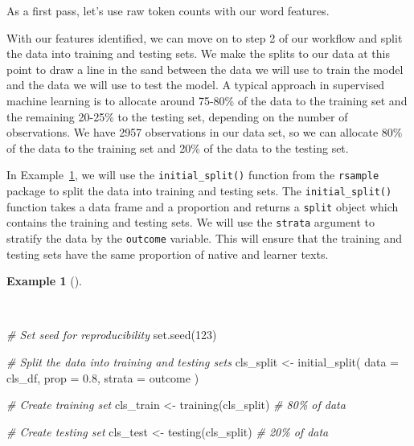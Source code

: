 \documentclass[
  letterpaper,
  DIV=11,
  numbers=noendperiod]{scrreprt}
\newenvironment{Shaded}{\begin{snugshade}}{\end{snugshade}}
\newcommand{\AttributeTok}[1]{\textcolor[rgb]{0.00,0.00,0.00}{#1}}
\newcommand{\CommentTok}[1]{\textcolor[rgb]{0.00,0.00,0.00}{\textit{#1}}}
\newcommand{\DecValTok}[1]{\textcolor[rgb]{0.00,0.00,0.00}{#1}}
\newcommand{\FloatTok}[1]{\textcolor[rgb]{0.00,0.00,0.00}{#1}}
\newcommand{\FunctionTok}[1]{\textcolor[rgb]{0.00,0.00,0.00}{#1}}
\newcommand{\NormalTok}[1]{\textcolor[rgb]{0.00,0.00,0.00}{#1}}
\newcommand{\OtherTok}[1]{\textcolor[rgb]{0.00,0.00,0.00}{#1}}
\theoremstyle{definition}
\newtheorem{example}{Example}[chapter]
\theoremstyle{remark}
\begin{document}
As a first pass, let's use raw token counts with our word features.

With our features identified, we can move on to step 2 of our workflow
and split the data into training and testing sets. We make the splits to
our data at this point to draw a line in the sand between the data we
will use to train the model and the data we will use to test the model.
A typical approach in supervised machine learning is to allocate around
75-80\% of the data to the training set and the remaining 20-25\% to the
testing set, depending on the number of observations. We have 2957
observations in our data set, so we can allocate 80\% of the data to the
training set and 20\% of the data to the testing set.

In Example~\ref{exm-pda-class-split}, we will use the
\texttt{initial\_split()} function from the \texttt{rsample} package to
split the data into training and testing sets. The
\texttt{initial\_split()} function takes a data frame and a proportion
and returns a \texttt{split} object which contains the training and
testing sets. We will use the \texttt{strata} argument to stratify the
data by the \texttt{outcome} variable. This will ensure that the
training and testing sets have the same proportion of native and learner
texts.

\begin{example}[]\protect\hypertarget{exm-pda-class-split}{}\label{exm-pda-class-split}

~

\begin{Shaded}
\begin{Highlighting}[]
\CommentTok{\# Set seed for reproducibility}
\FunctionTok{set.seed}\NormalTok{(}\DecValTok{123}\NormalTok{)}

\CommentTok{\# Split the data into training and testing sets}
\NormalTok{cls\_split }\OtherTok{\textless{}{-}}
  \FunctionTok{initial\_split}\NormalTok{(}
    \AttributeTok{data =}\NormalTok{ cls\_df,}
    \AttributeTok{prop =} \FloatTok{0.8}\NormalTok{,}
    \AttributeTok{strata =}\NormalTok{ outcome}
\NormalTok{  )}

\CommentTok{\# Create training set}
\NormalTok{cls\_train }\OtherTok{\textless{}{-}} \FunctionTok{training}\NormalTok{(cls\_split)  }\CommentTok{\# 80\% of data}

\CommentTok{\# Create testing set}
\NormalTok{cls\_test }\OtherTok{\textless{}{-}} \FunctionTok{testing}\NormalTok{(cls\_split)    }\CommentTok{\# 20\% of data}
\end{Highlighting}
\end{Shaded}

\end{example}
\end{document}
